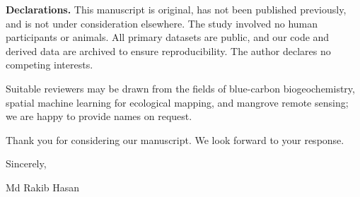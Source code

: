 \documentclass[11pt]{letter}
\begin{document}
\textbf{Declarations.} This manuscript is original, has not been published previously, and
is not under consideration elsewhere. The study involved no human participants or animals.
All primary datasets are public, and our code and derived data are archived to ensure
reproducibility. The author declares no competing interests.

Suitable reviewers may be drawn from the fields of blue-carbon biogeochemistry, spatial
machine learning for ecological mapping, and mangrove remote sensing; we are happy to
provide names on request.

Thank you for considering our manuscript. We look forward to your response.

Sincerely,

Md Rakib Hasan
\end{document}
